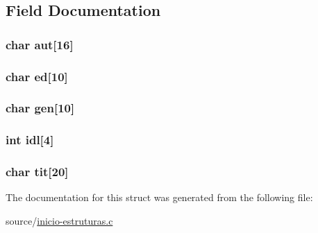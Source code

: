 \subsection{Field Documentation}
\hypertarget{struct_l_i_v_r_o_s_a5273ad9b6cc5de9aa63db51e74d2e950}{
\subsubsection[{aut}]{\setlength{\rightskip}{0pt plus 5cm}char aut\mbox{[}16\mbox{]}}}\label{struct_l_i_v_r_o_s_a5273ad9b6cc5de9aa63db51e74d2e950}
\hypertarget{struct_l_i_v_r_o_s_a7343f3b439e393d55096dfa02214fd4a}{
\subsubsection[{ed}]{\setlength{\rightskip}{0pt plus 5cm}char ed\mbox{[}10\mbox{]}}}\label{struct_l_i_v_r_o_s_a7343f3b439e393d55096dfa02214fd4a}
\hypertarget{struct_l_i_v_r_o_s_a81b3cc6450c77481974037c3222cb9ff}{
\subsubsection[{gen}]{\setlength{\rightskip}{0pt plus 5cm}char gen\mbox{[}10\mbox{]}}}\label{struct_l_i_v_r_o_s_a81b3cc6450c77481974037c3222cb9ff}
\hypertarget{struct_l_i_v_r_o_s_ac9639d5d4181be687dc6d15def280e26}{
\subsubsection[{idl}]{\setlength{\rightskip}{0pt plus 5cm}int idl\mbox{[}4\mbox{]}}}\label{struct_l_i_v_r_o_s_ac9639d5d4181be687dc6d15def280e26}
\hypertarget{struct_l_i_v_r_o_s_ab8164aa01854c06df11e1e1f22d32f22}{
\subsubsection[{tit}]{\setlength{\rightskip}{0pt plus 5cm}char tit\mbox{[}20\mbox{]}}}\label{struct_l_i_v_r_o_s_ab8164aa01854c06df11e1e1f22d32f22}


The documentation for this struct was generated from the following file\+:\begin{DoxyCompactItemize}
\item 
source/\hyperlink{inicio-estruturas_8c}{inicio-\/estruturas.\+c}\end{DoxyCompactItemize}
